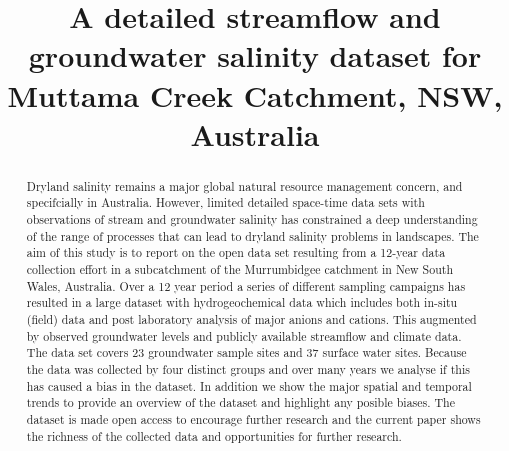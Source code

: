 \documentclass[, manuscript]{copernicus}
\begin{document}
\title{A detailed streamflow and groundwater salinity dataset for
Muttama Creek Catchment, NSW, Australia}











\received{}
\pubdiscuss{} %
\revised{}
\accepted{}
\published{}




\maketitle


\begin{abstract}
Dryland salinity remains a major global natural resource management
concern, and specifcially in Australia. However, limited detailed
space-time data sets with observations of stream and groundwater
salinity has constrained a deep understanding of the range of processes
that can lead to dryland salinity problems in landscapes. The aim of
this study is to report on the open data set resulting from a 12-year
data collection effort in a subcatchment of the Murrumbidgee catchment
in New South Wales, Australia. Over a 12 year period a series of
different sampling campaigns has resulted in a large dataset with
hydrogeochemical data which includes both in-situ (field) data and post
laboratory analysis of major anions and cations. This augmented by
observed groundwater levels and publicly available streamflow and
climate data. The data set covers 23 groundwater sample sites and 37
surface water sites. Because the data was collected by four distinct
groups and over many years we analyse if this has caused a bias in the
dataset. In addition we show the major spatial and temporal trends to
provide an overview of the dataset and highlight any posible biases. The
dataset is made open access to encourage further research and the
current paper shows the richness of the collected data and opportunities
for further research.
\end{abstract}
\end{document}
